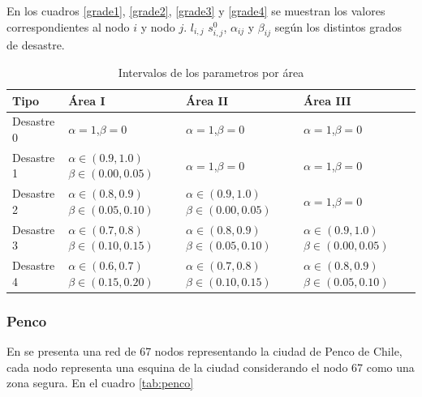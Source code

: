 En los cuadros \ref{grade1}, \ref{grade2}, \ref{grade3} y \ref{grade4} se muestran los valores correspondientes al nodo $i$ y nodo $j$. $l_{i,j}$ $s_{i,j}^0$, $\alpha_{ij}$ y $\beta_{ij}$ según los distintos grados de desastre.



\begin{table}[H]
\centering
\begin{tabular}{|l|l|l|l|}
\hline
Tipo & Área I & Área II & Área III \\ \hline
Desastre 0 & $\alpha=1$,$\beta=0$ & $\alpha=1$,$\beta=0$ & $\alpha=1$,$\beta=0$ \\ \hline
Desastre 1 & $\alpha \in (0.9,1.0)$ $\beta \in (0.00,0.05)$ & $\alpha=1$,$\beta=0$ & $\alpha=1$,$\beta=0$ \\ \hline
Desastre 2 & $\alpha \in (0.8,0.9)$ $\beta \in (0.05,0.10)$ & $\alpha \in (0.9,1.0)$ $\beta \in (0.00,0.05)$ & $\alpha=1$,$\beta=0$ \\ \hline
Desastre 3 & $\alpha \in (0.7,0.8)$ $\beta \in (0.10,0.15)$ & $\alpha \in (0.8,0.9)$ $\beta \in (0.05,0.10)$ & $\alpha \in (0.9,1.0)$ $\beta \in (0.00,0.05)$ \\ \hline
Desastre 4 & $\alpha \in (0.6,0.7)$ $\beta \in (0.15,0.20)$ & $\alpha \in (0.7,0.8)$ $\beta \in (0.10,0.15)$ & $\alpha \in (0.8,0.9)$ $\beta \in (0.05,0.10)$ \\ \hline
\end{tabular}
\caption{Intervalos de los parametros por área}\label{table:intervalo}
\end{table}

\subsubsection{Penco}

En \cite{forcael2014ant} se presenta una red de 67 nodos representando la ciudad de Penco de Chile, cada nodo representa una esquina de la ciudad considerando el nodo 67 como una zona segura. En el cuadro \ref{tab:penco}